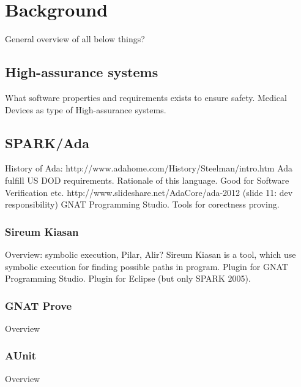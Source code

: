 
\cleardoublepage


\chapter{Background}
\label{background}

General overview of all below things?

\section{High-assurance systems}
\label{background:highas}
What software properties and requirements exists to ensure safety.
Medical Devices as type of High-assurance systems.


\section{SPARK/Ada}
\label{background:spark}
History of Ada: http://www.adahome.com/History/Steelman/intro.htm 
Ada fulfill US DOD requirements.
Rationale of this language. Good for Software Verification etc.
http://www.slideshare.net/AdaCore/ada-2012 (slide 11: dev responsibility)
GNAT Programming Studio.
Tools for corectness proving.

\subsection{Sireum Kiasan}
\label{background:spark:sireum}
Overview: symbolic execution, Pilar, Alir\cite{THB}?
Sireum Kiasan\cite{DLR} is a tool, which use symbolic execution for finding possible paths in program.
Plugin for GNAT Programming Studio.
Plugin for Eclipse (but only SPARK 2005).

\subsection{GNAT Prove}
\label{background:spark:gnatprove}
Overview

\subsection{AUnit}
\label{background:spark:aunit}
Overview


